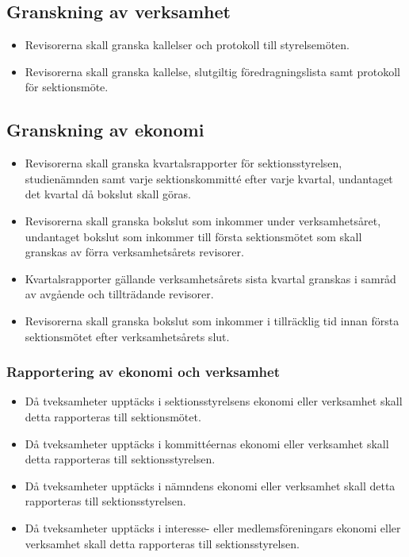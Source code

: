 \documentclass[a4paper]{article}
\begin{document}
\begin{foreningenv}{\forening{}}
    \subsection{Granskning av verksamhet}
    \begin{itemize}
        \item Revisorerna skall granska kallelser och protokoll till styrelsemöten.
        \item Revisorerna skall granska kallelse, slutgiltig föredragningslista samt protokoll för sektionsmöte.
    \end{itemize}
    
    \subsection{Granskning av ekonomi}
    \begin{itemize}
        \item Revisorerna skall granska kvartalsrapporter för sektionsstyrelsen, studienämnden samt varje sektionskommitté efter varje kvartal, undantaget det kvartal då bokslut skall göras.
        \item Revisorerna skall granska bokslut som inkommer under verksamhetsåret, undantaget bokslut som inkommer till första sektionsmötet som skall granskas av förra verksamhetsårets revisorer.
        \item Kvartalsrapporter gällande verksamhetsårets sista kvartal granskas i samråd av avgående och tillträdande revisorer.
        \item Revisorerna skall granska bokslut som inkommer i tillräcklig tid innan första sektionsmötet efter verksamhetsårets slut.
    \end{itemize}
    
    \subsubsection{Rapportering av ekonomi och verksamhet}
    \begin{itemize}
        \item Då tveksamheter upptäcks i sektionsstyrelsens ekonomi eller verksamhet skall detta rapporteras till sektionsmötet.
        \item Då tveksamheter upptäcks i kommittéernas ekonomi eller verksamhet skall detta rapporteras till sektionsstyrelsen.
        \item Då tveksamheter upptäcks i nämndens ekonomi eller verksamhet skall detta rapporteras till sektionsstyrelsen.
        \item Då tveksamheter upptäcks i interesse- eller medlemsföreningars ekonomi eller verksamhet skall detta rapporteras till sektionsstyrelsen.
    \end{itemize}
\end{foreningenv}
\end{document}
